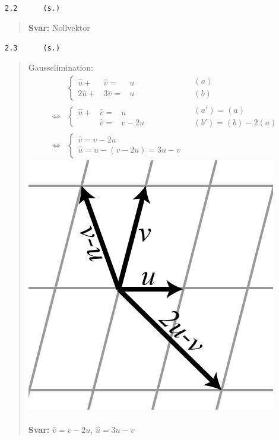 \documentclass[a4paper]{article}
\newcommand{\tskcol}[1]{\textcolor{tskcol}{#1}}
\begin{document}
\pagebreak
\texttt{\tskcol{2.2~~~~~ (s.)}}
\begin{quotation}
	\textbf{Svar:} Nollvektor
\end{quotation}

\texttt{\tskcol{2.3~~~~~ (s.)}}
\begin{quotation}
	\noindent
	Gausselimination:
	\begin{align*}
	&\left\{\begin{array}{rrr}
	 \hat{u}+& \hat{v}=&u \\
	2\hat{u}+&3\hat{v}=&u
	\end{array}\right.
	&\begin{array}{l}
	(a) \\
	(b)
	\end{array} \\ \Leftrightarrow
	&\left\{\begin{array}{rrr}
	\hat{u}+&\hat{v}=&u \\
	        &\hat{v}=&v-2u
	\end{array}\right.
	&\begin{array}{l}
	(a')=(a) \\
	(b')=(b)-2(a)
	\end{array} \\ \Leftrightarrow
	&\begin{cases}
	\hat{v}=v-2u \\
	\hat{u}=u-(v-2u)=3u-v
	\end{cases}
	\end{align*}
	\includegraphics[scale=0.3]{images/23.PNG}
	\\ \\
	\textbf{Svar:} $\hat{v}=v-2u$, $\hat{u}=3u-v$
\end{quotation}
\end{document}
